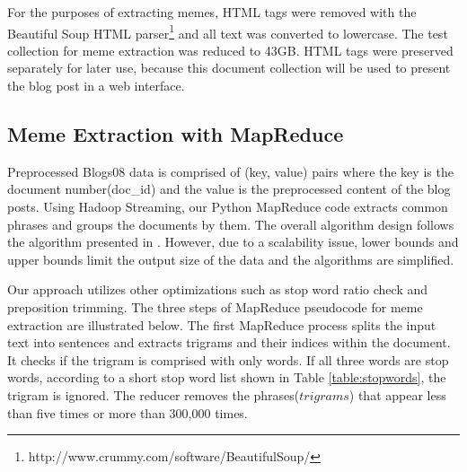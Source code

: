 \documentclass{sig-alternate}
\begin{document}
For the purposes of extracting memes, HTML tags were removed with the Beautiful Soup HTML parser\footnote{http://www.crummy.com/software/BeautifulSoup/} and all text was converted to lowercase. The test collection for meme extraction was reduced to 43GB. HTML tags were preserved separately for later use, because this document collection will be used to present the blog post in a web interface.

\subsection{Meme Extraction with MapReduce}

Preprocessed Blogs08 data is comprised of (key, value) pairs where the key is the document number(doc\_id) and the value is the preprocessed content of the blog posts. Using Hadoop Streaming, our Python MapReduce code extracts common phrases and groups the documents by them. The overall algorithm design follows the algorithm presented in \cite{Kolak2008}. However, due to a scalability issue, lower bounds and upper bounds limit the output size of the data and the algorithms are simplified.

Our approach utilizes other optimizations such as stop word ratio check and preposition trimming. The three steps of MapReduce pseudocode for meme extraction are illustrated below. The first MapReduce process splits the input text into sentences and extracts trigrams and their indices within the document. It checks if the trigram is comprised with only words. If all three words are stop words, according to a short stop word list shown in Table \ref{table:stopwords}, the trigram is ignored. The reducer removes the phrases($trigrams$) that appear less than five times or more than 300,000 times.
\end{document}
